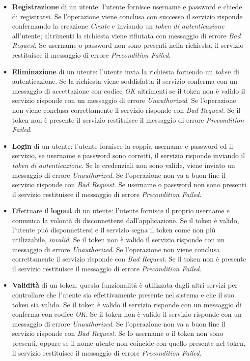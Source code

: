 \begin{itemize}
%
    \item \textbf{Registrazione} di un utente: l'utente fornisce username e password e chiede di registrarsi. Se l'operazione viene conclusa con successo il servizio risponde confermando la creazione \textit{Create} e inviando un \textit{token di autenticazione} all'utente; altrimenti la richiesta viene rifiutata con messaggio di errore \textit{Bad Request}. Se username o password non sono presenti nella richiesta, il servizio restituisce il messaggio di errore \textit{Precondition Failed}.
%
    \item \textbf{Eliminazione} di un utente: l'utente invia la richiesta fornendo un \textit{token} di autenticazione. Se la richiesta viene soddisfatta il servizio conferma con un messaggio di accettazione con codice \textit{OK} altrimenti se il token non è valido il servizio risponde con un messaggio di errore \textit{Unauthorized}. Se l'operazione non viene conclusa correttamente il servizio risponde con \textit{Bad Request}. Se il token non è presente il servizio restituisce il messaggio di errore \textit{Precondition Failed}.
%
    \item \textbf{Login} di un utente: l'utente fornisce la coppia username e password ed il servizio, se username e password sono corretti, il servizio risponde inviando il \textit{token di autenticazione}. Se le credenziali non sono valide, viene inviato un messaggio di errore \textit{Unauthorized}. Se l'operazione non va a buon fine il servizio risponde con \textit{Bad Request}. Se username o password non sono presenti il servizio restituisce il messaggio di errore \textit{Precondition Failed}.
%
    \item Effettuare il \textbf{logout} di un utente: l'utente fornisce il proprio username e comunica la volontà di disconnettersi dall'applicazione. Se il token è valido, l'utente può disponnettersi e il servizio segna il token come non più utilizzabile, \textit{invalid}. Se il token non è valido il servizio risponde con un messaggio di errore \textit{Unauthorized}. Se l'operazione non viene conclusa correttamente il servizio risponde con \textit{Bad Request}.
    Se il token non è presente il servizio restituisce il messaggio di errore \textit{Precondition Failed}.
%
    \item \textbf{Validità} di un token: questa funzionalità è utilizzata dagli altri servizi per controllare che l'utente sia effettivamente presente nel sistema e che il suo token sia valido. Se il token è valido il servizio risponde con un messaggio di conferma con codice \textit{OK}. Se il token non è valido il servizio risponde con un messaggio di errore \textit{Unauthorized}. Se l'operazione non va a buon fine il servizio risponde con \textit{Bad Request}. Se lo username o il token non sono presenti, oppure se il nome utente non coincide con quello presente nel token, il servizio restituisce il messaggio di errore \textit{Precondition Failed}.
%    
\end{itemize}

